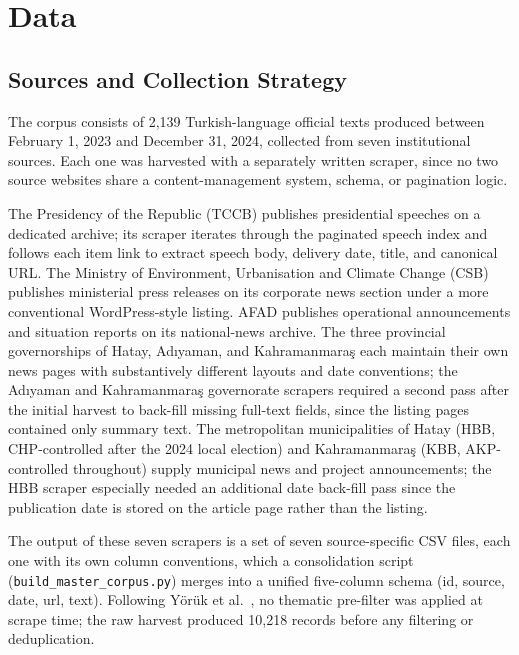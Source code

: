 \documentclass[12pt, journal]{IEEEtran}
\begin{document}
\section{Data}
\subsection{Sources and Collection Strategy}
The corpus consists of 2,139 Turkish-language official texts produced between February 1, 2023 and December 31, 2024, collected from seven institutional sources. Each one was harvested with a separately written scraper, since no two source websites share a content-management system, schema, or pagination logic.

The Presidency of the Republic (TCCB) publishes presidential speeches on a dedicated archive; its scraper iterates through the paginated speech index and follows each item link to extract speech body, delivery date, title, and canonical URL. The Ministry of Environment, Urbanisation and Climate Change (CSB) publishes ministerial press releases on its corporate news section under a more conventional WordPress-style listing. AFAD publishes operational announcements and situation reports on its national-news archive. The three provincial governorships of Hatay, Ad\i yaman, and Kahramanmara\c{s} each maintain their own news pages with substantively different layouts and date conventions; the Ad\i yaman and Kahramanmara\c{s} governorate scrapers required a second pass after the initial harvest to back-fill missing full-text fields, since the listing pages contained only summary text. The metropolitan municipalities of Hatay (HBB, CHP-controlled after the 2024 local election) and Kahramanmara\c{s} (KBB, AKP-controlled throughout) supply municipal news and project announcements; the HBB scraper especially needed an additional date back-fill pass since the publication date is stored on the article page rather than the listing.

The output of these seven scrapers is a set of seven source-specific CSV files, each one with its own column conventions, which a consolidation script (\texttt{build\_master\_corpus.py}) merges into a unified five-column schema (id, source, date, url, text). Following Y\"or\"uk et al.~\cite{yoruk2022random}, no thematic pre-filter was applied at scrape time; the raw harvest produced 10,218 records before any filtering or deduplication.
\end{document}
